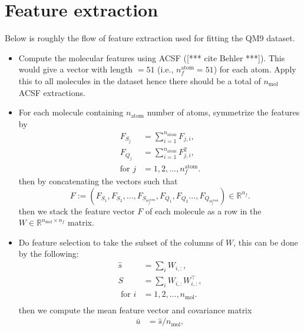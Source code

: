 \documentclass[12pt]{article}
\def\att{                    %
        \marginpar[ \hspace*{\fill} \raisebox{-0.2em}{\rule{2mm}{1.2em}} ]
        {\raisebox{-0.2em}{\rule{2mm}{1.2em}} }
        }
\def\at#1{[*** \att #1 ***]}  %
\begin{document}
\section{Feature extraction}
Below is roughly the flow of feature extraction used for fitting the QM9 dataset.
\begin{itemize}
    \item Compute the molecular features using ACSF (\at{cite Behler}). This would give a vector with length $= 51$ (i.e., $n^\text{atom}_f = 51$) for each atom. Apply this to all molecules in the dataset hence there should be a total of $n_\text{mol}$ ACSF extractions.
    \item For each molecule containing $n_\text{atom}$ number of atoms, symmetrize the features by
        \begin{equation}
            \begin{split}
                F_{S_j} &= \sum_{i=1}^{n_{\text{atom}}} F_{j,i},\\
                F_{Q_j} &= \sum_{i=1}^{n_{\text{atom}}} F_{j,i}^2, \\
                \text{for }j &= 1,2,..., n^\text{atom}_f. 
            \end{split}
        \end{equation}
        then by concatenating the vectors such that
        \begin{equation}
            F := (F_{S_1}, F_{S_2}, ..., F_{S_{n^\text{atom}_f}}, F_{Q_1},F_{Q_2} ..., F_{Q_{n^\text{atom}_f}}) \in \mathbb{R}^{n_f}.
        \end{equation}
    	then we stack the feature vector $F$ of each molecule as a row in the $W \in \mathbb{R}^{n_\text{mol} \times n_f}$ matrix.
    \item Do feature selection to take the subset of the columns of $W$, this can be done by the following:
	    \begin{equation}
			\begin{split}
				\hat{s} &= \sum_i W_{i,:}, \\
				S &= \sum_i W_{i,:}W_{i,:}^\top, \\
				\text{ for } i &= 1,2,...,n_{\text{mol}}. \\
			\end{split}
	    \end{equation}
		then we compute the mean feature vector and covariance matrix
		\begin{equation}
			\begin{split}
				\bar{u} &= \hat{s}/n_\text{mol}, \\

\end{split}
\end{equation}
\end{itemize}
\end{document}
